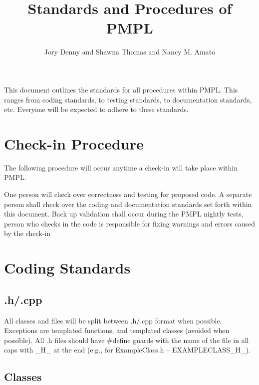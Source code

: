 \documentclass[12pt]{article}
\title{\Large \bf Standards and Procedures of PMPL}
\author{Jory Denny and Shawna Thomas and Nancy M. Amato}
\begin{document}
\thispagestyle{empty}
\pagestyle{empty}
\maketitle

This document outlines the standards for all procedures within PMPL. This ranges from coding standards, to testing
standards, to documentation standards, etc. Everyone will be expected to adhere to these standards.


\section{Check-in Procedure}
The following procedure will occur anytime a check-in will take place within PMPL.
\begin{algorithmic}[1]
\STATE One person will check over correctness and testing for proposed code.
\STATE A separate person shall check over the coding and documentation standards set forth within this document.
\STATE Back up validation shall occur during the PMPL nightly tests, person who checks in the code is responsible for
fixing warnings and errors caused by the check-in
\end{algorithmic}


\section{Coding Standards}

\subsection{.h/.cpp}
All classes and files will be split between .h/.cpp format when possible. Exceptions are templated functions, and templated
classes (avoided when possible). All .h files should have \#define guards with the name of the file in all caps with
\_H\_ at the end (e.g., for ExampleClass.h -- EXAMPLECLASS\_H\_).

\subsection{Classes}
\end{document}
